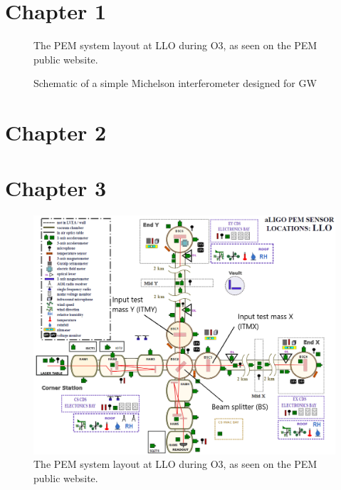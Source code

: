 \documentclass[11pt]{article}
\begin{document}


\section{Chapter 1}

\begin{figure}[h!]
	\centering
	\caption{
		The PEM system layout at LLO during O3, as seen on the PEM public website.}
	\label{fig:gw-polarization}
\end{figure}

\begin{figure}[h!]
	\centering
	\caption{
		Schematic of a simple Michelson interferometer designed for GW}
	\label{fig:gw-ifo}
\end{figure}

\section{Chapter 2}

\section{Chapter 3}

\begin{figure}[h!]
	\centering
	\includegraphics[width=\textwidth]{figures/pem-channels.png}
	\caption{
		The PEM system layout at LLO during O3, as seen on the PEM public website.}
	\label{fig:pem-channels}
\end{figure}
\end{document}
